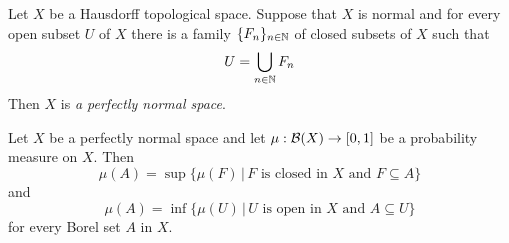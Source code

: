 \begin{definition}
Let $X$ be a Hausdorff topological space. Suppose that $X$ is normal and for every open subset $U$ of $X$ there is a family $\{F_n\}_{n\in {\mathbb N}}$ of closed subsets of $X$ such that
$$U = \bigcup_{n\in {\mathbb N}}F_n$$
Then $X$ is \textit{a perfectly normal space}. 
\end{definition}

\begin{proposition}\label{proposition:perfectly_normal_spaces_approximation_by_open_and_closed_subsets}
Let $X$ be a perfectly normal space and let $\mu:{\mathcal B}(X)\rightarrow [0,1]$ be a probability measure on $X$. Then
$$\mu(A) = \sup \big\{\mu(F)\,\big|\,F\mbox{ is closed in }X\mbox{ and }F\subseteq A\big\}$$
and
$$\mu(A) = \inf \big\{\mu(U)\,\big|\,U\mbox{ is open in }X\mbox{ and }A\subseteq U\big\}$$
for every Borel set $A$ in $X$.
\end{proposition}

